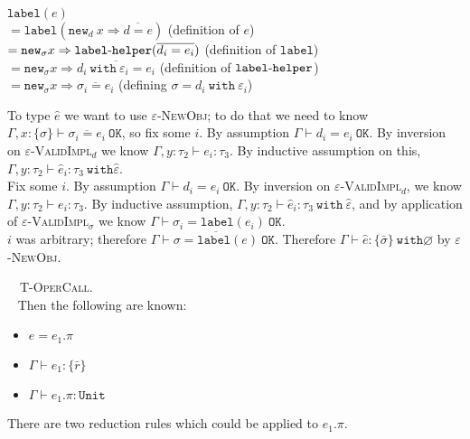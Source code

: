\documentclass{llncs}
\newcommand{\keywadj}[1]{\mathtt{#1}}
\newcommand{\keyw}[1]{\keywadj{#1}~}
\newcommand{\kw}[1]{\keyw{ #1 }}
\newcommand{\kwa}[1]{\keywadj{ #1 }}
\newcommand{\hyphen}{\hbox{-}}
\newcommand{\proofcase}[2]{
	\begin{adjustwidth}{1.5em}{0pt}
		\fbox{Case.}~~#1. \\ ~#2
	\end{adjustwidth}
}
\newcommand{\newd}[0]{
	\keywadj{new}_d~x \Rightarrow \overline{d = e}
}
\begin{document}
{{\begin{adjustwidth}{1.5em}{0em}
$\kwa{label}(e)$ \\
$= \kwa{label}(\newd)$
\tabto{18em} (definition of $e$) \\
$= \kwa{new}_\sigma x \Rightarrow \kwa{label \hyphen helper}(\overline{d_i = e_i})$
\tabto{18em} (definition of $\kwa{label}$) \\
$= \kwa{new}_\sigma x \Rightarrow \overline{d_i~\kw{with} \varepsilon_i = e_i}$ 
\tabto{18em} (definition of $\kwa{label \hyphen helper}$) \\
$= \kwa{new}_\sigma x \Rightarrow \overline{\sigma_i = e_i}$
\tabto{18em} (defining $\sigma = d_i~\kw{with} \varepsilon_i$)
\end{adjustwidth}

\noindent
To type $\hat e$ we want to use \textsc{$\varepsilon$-NewObj}; to do that we need to know $\Gamma, x : \{ \sigma \} \vdash \overline{\sigma_i = e_i}~\kwa{OK}$, so fix some $i$. By assumption $\Gamma \vdash d_i = e_i~\kwa{OK}$. By inversion on \textsc{$\varepsilon$-ValidImpl$_d$} we know $\Gamma, y : \tau_2 \vdash e_i : \tau_3$. By inductive assumption on this, $\Gamma, y : \tau_2 \vdash \hat e_i : \tau_3~\kwa{with} \hat \varepsilon$. \\

\noindent
Fix some $i$. By assumption $\Gamma \vdash d_i = e_i~\kwa{OK}$. By inversion on \textsc{$\varepsilon$-ValidImpl$_d$}, we know $\Gamma, y : \tau_2 \vdash e_i : \tau_3$. By inductive assumption, $\Gamma, y : \tau_2 \vdash \hat e_i : \tau_3~\kw{with} \hat \varepsilon$, and by application of \textsc{$\varepsilon$-ValidImpl$_\sigma$} we know $\Gamma \vdash \sigma_i = \kwa{label}(e_i)~\kwa{OK}$. \\

\noindent
$i$ was arbitrary; therefore $\Gamma \vdash \overline{\sigma = \kwa{label}(e)}~\kwa{OK}$. Therefore $\Gamma \vdash \hat e : \{ \bar \sigma \}~\kwa{with} \varnothing$ by \textsc{$\varepsilon$-NewObj}.

}


\proofcase{\textsc{T-OperCall}}{
Then the following are known:
\begin{itemize}
	\item $e = e_1.\pi$
	\item $\Gamma \vdash e_1 : \{ \bar r \}$
	\item $\Gamma \vdash e_1.\pi : \keywadj{Unit}$
\end{itemize}
There are two reduction rules which could be applied to $e_1.\pi$.\\

}}
\end{document}
